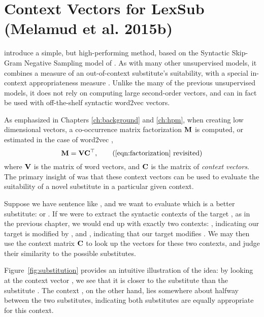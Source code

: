 \section{Context Vectors for LexSub (Melamud et al. 2015b)}

 introduce a simple, but high-performing method,
based on the Syntactic Skip-Gram Negative Sampling model of
. As with many other unsupervised models, it combines a
measure of an out-of-context substitute's suitability, with a special
in-context appropriateness measure \cite{needcite}. Unlike the many of the
previous unsupervised models, it does not rely on computing large second-order
vectors, and can in fact be used with off-the-shelf syntactic word2vec vectors.

As emphasized in Chapters \ref{ch:background} and \ref{ch:hpm}, when creating
low dimensional vectors, a co-occurrence matrix factorization ${{\mathbf{M}}}$ is
computed, or estimated in the case of word2vec \cite{levy:2014:nips},
\begin{equation*}
  \mM = \mV\mC\trans,
  \tag{\ref{eqn:factorization} revisited}
\end{equation*}
where ${{\mathbf{V}}}$ is the matrix of word vectors, and ${{\mathbf{C}}}$ is the matrix of
{\em context vectors}. The primary insight of 
was that these context vectors can be used to evaluate the suitability of a
novel substitute in a particular given context.

Suppose we have sentence like , and we
want to evaluate which is a better substitute:  or .
If we were to extract the syntactic contexts of the target , as in
the previous chapter, we would end up with exactly two contexts:
, indicating our target is modified by , and
, indicating that our target modifies
. We may then use the context matrix ${{\mathbf{C}}}$ to look up the
vectors for these two contexts, and judge their similarity to the possible
substitutes.

Figure~\ref{fig:substitution} provides an intuitive illustration of the idea:
by looking at the context vector , we see that it is
closer to the substitute  than the substitute . The
context , on the other hand, lies somewhere about halfway
between the two substitutes, indicating both substitutes are equally appropriate
for this context.

